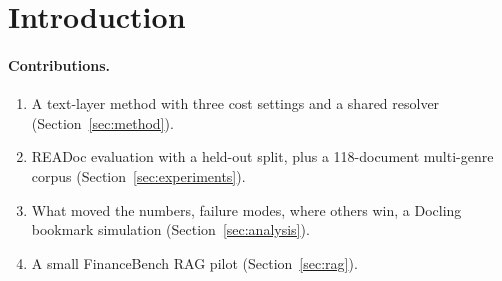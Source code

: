 \section{Introduction}
\label{sec:intro}

\paragraph{Contributions.}
\begin{enumerate}
  \item A text-layer method with three cost settings and a shared resolver (Section~\ref{sec:method}).
  \item READoc evaluation with a held-out split, plus a 118-document multi-genre corpus (Section~\ref{sec:experiments}).
  \item What moved the numbers, failure modes, where others win, a Docling bookmark simulation (Section~\ref{sec:analysis}).
  \item A small FinanceBench RAG pilot (Section~\ref{sec:rag}).
\end{enumerate}
